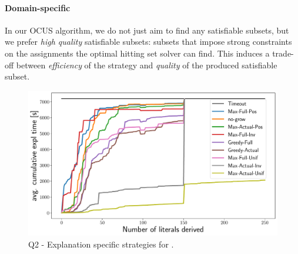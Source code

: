 \paragraph{Domain-specific \grow} 
In our OCUS algorithm, we do not just aim to find any satisfiable subsets, but we prefer \emph{high quality} satisfiable subsets: subsets that impose strong constraints on the assignments the optimal hitting set solver can find. 
This induces a trade-off between \emph{efficiency} of the \grow strategy and \emph{quality} of the produced satisfiable subset.

\begin{figure}[ht]
  \centering
  \includegraphics[width=\columnwidth]{figures_post_paper/new_cumul_grow_avg_time_lits_derived.pdf}
  \caption{Q2 - Explanation specific \grow strategies for \comus.}
  \label{fig:grow_strategies}
\end{figure}


